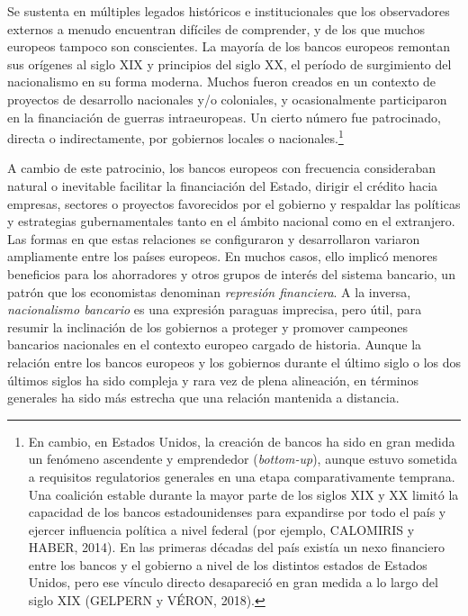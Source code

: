 \documentclass[10pt,a4paper]{article}
\begin{document}
{Se sustenta en múltiples legados históricos e institucionales que los observadores externos a menudo encuentran difíciles de comprender, y de los que muchos europeos tampoco son conscientes. La mayoría de los bancos europeos remontan sus orígenes al siglo XIX y principios del siglo XX, el período de surgimiento del nacionalismo en su forma moderna. Muchos fueron creados en un contexto de proyectos de desarrollo nacionales y/o coloniales, y ocasionalmente participaron en la financiación de guerras intraeuropeas. Un cierto número fue patrocinado, directa o indirectamente, por gobiernos locales o nacionales.\footnote{%
    En cambio, en Estados Unidos, la creación de bancos ha sido en gran medida un fenómeno ascendente y emprendedor (\textit{bottom-up}), aunque estuvo sometida a requisitos regulatorios generales en una etapa comparativamente temprana. Una coalición estable durante la mayor parte de los siglos XIX y XX limitó la capacidad de los bancos estadounidenses para expandirse por todo el país y ejercer influencia política a nivel federal (por ejemplo, CALOMIRIS y HABER, 2014). En las primeras décadas del país existía un nexo financiero entre los bancos y el gobierno a nivel de los distintos estados de Estados Unidos, pero ese vínculo directo desapareció en gran medida a lo largo del siglo XIX (GELPERN y VÉRON, 2018).
} 

A cambio de este patrocinio, los bancos europeos con frecuencia consideraban natural o inevitable facilitar la financiación del Estado, dirigir el crédito hacia empresas, sectores o proyectos favorecidos por el gobierno y respaldar las políticas y estrategias gubernamentales tanto en el ámbito nacional como en el extranjero. Las formas en que estas relaciones se configuraron y desarrollaron variaron ampliamente entre los países europeos. En muchos casos, ello implicó menores beneficios para los ahorradores y otros grupos de interés del sistema bancario, un patrón que los economistas denominan \textit{represión financiera}. A la inversa, \textit{nacionalismo bancario} es una expresión paraguas imprecisa, pero útil, para resumir la inclinación de los gobiernos a proteger y promover campeones bancarios nacionales en el contexto europeo cargado de historia. Aunque la relación entre los bancos europeos y los gobiernos durante el último siglo o los dos últimos siglos ha sido compleja y rara vez de plena alineación, en términos generales ha sido más estrecha que una relación mantenida a distancia.

}
\end{document}

